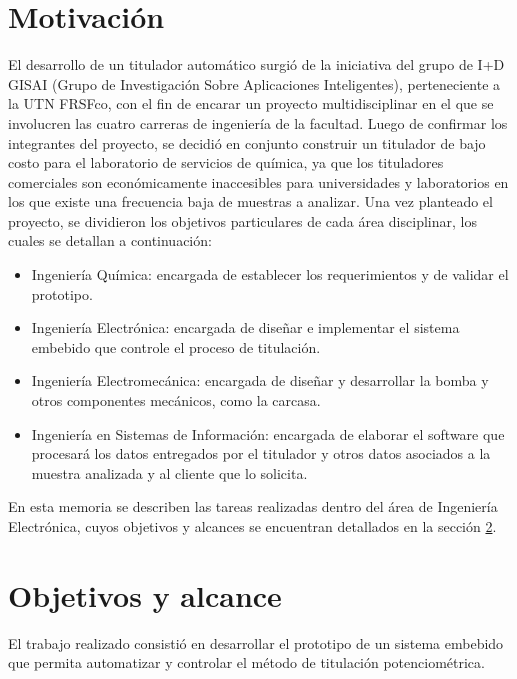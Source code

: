 \section{Motivación}
El desarrollo de un titulador automático surgió de la iniciativa del grupo de I+D GISAI (Grupo de Investigación Sobre Aplicaciones Inteligentes), perteneciente a la UTN FRSFco, con el fin de encarar un proyecto multidisciplinar en el que se involucren las cuatro carreras de ingeniería de la facultad. Luego de confirmar los integrantes del proyecto, se decidió en conjunto construir un titulador de bajo costo para el laboratorio de servicios de química, ya que los tituladores comerciales son económicamente inaccesibles para universidades y laboratorios en los que existe una frecuencia baja de muestras a analizar.
Una vez planteado el proyecto, se dividieron los objetivos particulares de cada área disciplinar, los cuales se detallan a continuación:
\begin{itemize}
\item Ingeniería Química: encargada de establecer los requerimientos y de validar el prototipo.
\item Ingeniería Electrónica: encargada de diseñar e implementar el sistema embebido que controle el proceso de titulación.
\item Ingeniería Electromecánica: encargada de diseñar y desarrollar la bomba y otros componentes mecánicos, como la carcasa.
\item Ingeniería en Sistemas de Información: encargada de elaborar el software que procesará los datos entregados por el titulador y otros datos asociados a la muestra analizada y al cliente que lo solicita.
\end{itemize}
En esta memoria se describen las tareas realizadas dentro del área de Ingeniería Electrónica, cuyos objetivos y alcances se encuentran detallados en la sección \ref{objYalc}.

\section{Objetivos y alcance}
\label{objYalc}

El trabajo realizado consistió en desarrollar el prototipo de un sistema embebido que permita automatizar y controlar el método de titulación potenciométrica.

